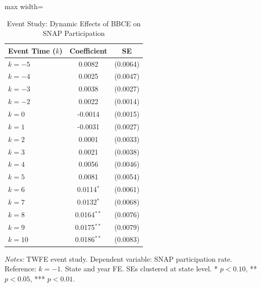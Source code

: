 
\begin{table}[H]
\centering
\caption{Event Study: Dynamic Effects of BBCE on SNAP Participation}
\label{tab:event}
\begin{adjustbox}{max width=\textwidth}
\begin{threeparttable}
\begin{tabular}{lcc}
\toprule
Event Time ($k$) & Coefficient & SE \\
\midrule
$k = -5$ & 0.0082 & (0.0064) \\
$k = -4$ & 0.0025 & (0.0047) \\
$k = -3$ & 0.0038 & (0.0027) \\
$k = -2$ & 0.0022 & (0.0014) \\
$k = 0$ & -0.0014 & (0.0015) \\
$k = 1$ & -0.0031 & (0.0027) \\
$k = 2$ & 0.0001 & (0.0033) \\
$k = 3$ & 0.0021 & (0.0038) \\
$k = 4$ & 0.0056 & (0.0046) \\
$k = 5$ & 0.0081 & (0.0054) \\
$k = 6$ & 0.0114$^{*}$ & (0.0061) \\
$k = 7$ & 0.0132$^{*}$ & (0.0068) \\
$k = 8$ & 0.0164$^{**}$ & (0.0076) \\
$k = 9$ & 0.0175$^{**}$ & (0.0079) \\
$k = 10$ & 0.0186$^{**}$ & (0.0083) \\
\bottomrule
\end{tabular}
\begin{tablenotes}[flushleft]
\small
\item \textit{Notes:} TWFE event study. Dependent variable: SNAP participation rate. Reference: $k=-1$. State and year FE. SEs clustered at state level. * $p<0.10$, ** $p<0.05$, *** $p<0.01$.
\end{tablenotes}
\end{threeparttable}
\end{adjustbox}
\end{table}

